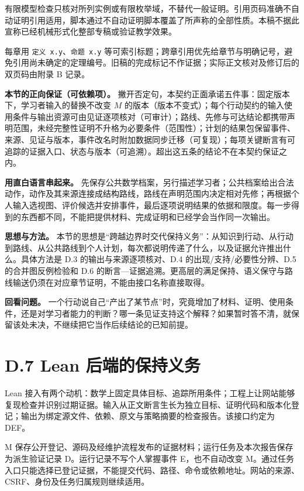 \documentclass[UTF8,a4paper,zihao=-4,fontset=windows,openany]{ctexbook}
\begin{document}
有限模型检查只核对所列实例或有限枚举域，不替代一般证明。引用页码准确不自动证明引用适用，脚本通过不自动证明脚本覆盖了所声称的全部性质。本稿不据此宣称已经机械形式化整部专稿或验证教学效果。

每章用 \texttt{定义 x.y}、\texttt{命题 x.y} 等可索引标题；跨章引用优先给章节与明确记号，避免引用尚未确定的定理编号。旧稿的完成标记不作证据；实际正文核对及修订后的双页码由附录 B 记录。

\textbf{本节的正向保证（可依赖项）。} 撇开否定句，本契约正面承诺五件事：固定版本下，学习者输入的替换不改变 \(M\) 的版本（版本不变式）；每个行动契约的输入使用条件与输出资源可由见证逐项核对（可审计）；路线、先修与可达结论都携带声明范围，未经完整性证明不升格为必要条件（范围性）；计划的结果包保留事件、来源、见证与版本，事件改名时附加数据同步迁移（可复现）；每项关键断言有可追踪的证据入口、状态与版本（可追溯）。超出这五条的结论不在本契约保证之内。

\textbf{用直白语言串起来。} 先保存公共数学档案，另行描述学习者；公共档案给出合法动作，动作及其来源连接成结构路线，路线在声明范围内决定相对先修；再根据个人输入选视图、评价候选并安排事件，最后逐项说明结果的依据和限度。每一步得到的东西都不同，不能把提供材料、完成证明和已经学会当作同一次输出。

\textbf{思想与方法。} 本节的思想是“跨越边界时交代保持义务”：从知识到行动、从行动到路线、从公共路线到个人计划，每次都说明传递了什么，以及证据允许推出什么。具体方法是 D.3 的输出与来源逐项核对、D.4 的出现/支持/必要性分辨、D.5 的合并图反例检验和 D.6 的断言—证据追溯。更高层的满足保持、语义保守与路线输送仍须在对应章节证明，不能由接口名称直接取得。

\textbf{回看问题。} 一个行动说自己“产出了某节点”时，究竟增加了材料、证明、使用条件，还是对学习者能力的判断？哪一条见证支持这个解释？如果暂时答不清，就保留该处未决，不继续把它当作后续结论的已知前提。

\section{D.7 Lean 后端的保持义务}
Lean 接入有两个动机：数学上固定具体目标、追踪所用条件；工程上让网站能够复现检查并识别过期证据。输入从正文断言生长为独立目标、证明代码和版本化登记；输出为绑定源文件、依赖、原文与策略摘要的检查报告。该接口约定为 DEF。

M 保存公开登记、源码及经维护流程发布的证据材料；运行任务及本次报告保存为派生验证记录 D。运行记录不写个人掌握事件 E，也不自动改变 M。通过任务入口只能选择已登记证据，不能提交代码、路径、命令或依赖地址。网站的来源、CSRF、身份及任务归属规则继续适用。
\end{document}
